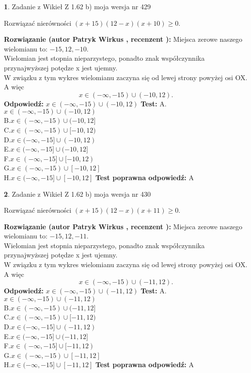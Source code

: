 \documentclass[12pt, a4paper]{article}
\theoremstyle{definition} %
\newtheorem{zad}{}
\newcommand{\zadStart}[1]{\begin{zad}#1\newline}
\newcommand{\zadStop}{\end{zad}}
\newcommand{\rozwStart}[2]{\noindent \textbf{Rozwiązanie (autor #1 , recenzent #2): }\newline}
\newcommand{\rozwStop}{\newline}
\newcommand{\odpStart}{\noindent \textbf{Odpowiedź:}\newline}
\newcommand{\odpStop}{\newline}
\newcommand{\testStart}{\noindent \textbf{Test:}\newline}
\newcommand{\testStop}{\newline}
\newcommand{\kluczStart}{\noindent \textbf{Test poprawna odpowiedź:}\newline}
\newcommand{\kluczStop}{\newline}
\begin{document}
\zadStart{Zadanie z Wikieł Z 1.62 b) moja wersja nr 429}

Rozwiązać nierówności $(x+15)(12-x)(x+10)\ge0$.
\zadStop
\rozwStart{Patryk Wirkus}{}
Miejsca zerowe naszego wielomianu to: $-15, 12, -10$.\\
Wielomian jest stopnia nieparzystego, ponadto znak współczynnika przy\linebreak najwyższej potędze x jest ujemny.\\ W związku z tym wykres wielomianu zaczyna się od lewej strony powyżej osi OX. A więc $$x \in (-\infty,-15) \cup (-10,12).$$
\rozwStop
\odpStart
$x \in (-\infty,-15) \cup (-10,12)$
\odpStop
\testStart
A.$x \in (-\infty,-15) \cup (-10,12)$\\
B.$x \in (-\infty,-15) \cup (-10,12]$\\
C.$x \in (-\infty,-15) \cup [-10,12)$\\
D.$x \in (-\infty,-15] \cup (-10,12)$\\
E.$x \in (-\infty,-15] \cup (-10,12]$\\
F.$x \in (-\infty,-15] \cup [-10,12)$\\
G.$x \in (-\infty,-15) \cup [-10,12]$\\
H.$x \in (-\infty,-15] \cup [-10,12]$
\testStop
\kluczStart
A
\kluczStop



\zadStart{Zadanie z Wikieł Z 1.62 b) moja wersja nr 430}

Rozwiązać nierówności $(x+15)(12-x)(x+11)\ge0$.
\zadStop
\rozwStart{Patryk Wirkus}{}
Miejsca zerowe naszego wielomianu to: $-15, 12, -11$.\\
Wielomian jest stopnia nieparzystego, ponadto znak współczynnika przy\linebreak najwyższej potędze x jest ujemny.\\ W związku z tym wykres wielomianu zaczyna się od lewej strony powyżej osi OX. A więc $$x \in (-\infty,-15) \cup (-11,12).$$
\rozwStop
\odpStart
$x \in (-\infty,-15) \cup (-11,12)$
\odpStop
\testStart
A.$x \in (-\infty,-15) \cup (-11,12)$\\
B.$x \in (-\infty,-15) \cup (-11,12]$\\
C.$x \in (-\infty,-15) \cup [-11,12)$\\
D.$x \in (-\infty,-15] \cup (-11,12)$\\
E.$x \in (-\infty,-15] \cup (-11,12]$\\
F.$x \in (-\infty,-15] \cup [-11,12)$\\
G.$x \in (-\infty,-15) \cup [-11,12]$\\
H.$x \in (-\infty,-15] \cup [-11,12]$
\testStop
\kluczStart
A
\kluczStop
\end{document}
